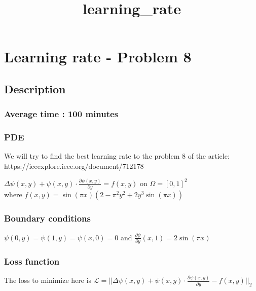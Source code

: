 \documentclass[11pt]{article}
\title{learning\_rate}
\begin{document}
    
    \maketitle
    
    

    
    \hypertarget{learning-rate---problem-8}{%
\section{Learning rate - Problem 8}\label{learning-rate---problem-8}}

\hypertarget{description}{%
\subsection{Description}\label{description}}

\hypertarget{average-time-100-minutes}{%
\subsubsection{Average time : 100
minutes}\label{average-time-100-minutes}}

\hypertarget{pde}{%
\subsubsection{PDE}\label{pde}}

We will try to find the best learning rate to the problem 8 of the
article: https://ieeexplore.ieee.org/document/712178

\(\Delta \psi(x,y) +\psi(x,y)\cdot\frac{\partial \psi(x,y)}{\partial y}= f(x,y)\)
on \(\Omega = [0,1]^2\)\\
where \(f(x, y)=\sin(\pi x)(2-\pi^2y^2+2y^3\sin(\pi x))\)

\hypertarget{boundary-conditions}{%
\subsubsection{Boundary conditions}\label{boundary-conditions}}

\(\psi(0,y)=\psi(1,y)=\psi(x,0)=0\) and
\(\frac{\partial \psi}{\partial y}(x,1)=2\sin(\pi x)\)

\hypertarget{loss-function}{%
\subsubsection{Loss function}\label{loss-function}}

The loss to minimize here is
\(\mathcal{L} = ||\Delta \psi(x,y) +\psi(x,y)\cdot\frac{\partial \psi(x,y)}{\partial y}-f(x,y) ||_2\)
\end{document}
